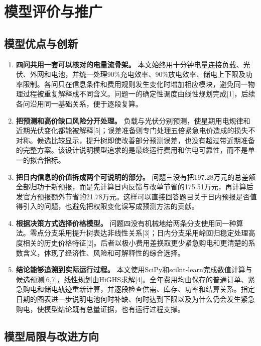 \section{模型评价与推广}

\subsection{模型优点与创新}

\begin{enumerate}
    \item \textbf{四问共用一套可以核对的电量流骨架。}
    本文始终用十分钟电量连接负载、光伏、外网和电池，并统一处理90\%充电效率、90\%放电效率、储电上下限及功率限制。各问只在信息条件和费用规则发生变化时增加相应模块，避免同一物理过程被重复解释成不同含义。问题一的确定性调度由线性规划完成[1]，后续各问沿用同一基础关系，便于逐段复算。

    \item \textbf{把预测和高价缺口风险分开处理。}
    负载与光伏分别预测，使星期用电规律和近期光伏变化都能被解释[5]；误差准备则专门处理五倍紧急电价造成的损失不对称。候选比较显示，提升树即使改善部分预测误差，也没有超过带近期准备的完整方案。该设计说明模型追求的是最终运行费用和供电可靠性，而不是单一的拟合指标。

    \item \textbf{把日内信息的价值拆成两个可说明的部分。}
    问题三没有把197.28万元的总差额全部归功于新预报，而是先计算日内反馈与改单节省的175.51万元，再计算后发官方预报额外节省的21.78万元。这样可以直接回答题目关于日内预报是否值得引入的问题，也避免把权限变化误写成预测方法的贡献。

    \item \textbf{根据决策方式选择价格模型。}
    问题四没有机械地给两条分支使用同一种算法。零点分支采用提升树表达非线性关系[3]；日内分支采用岭回归稳定处理高度相关的历史价格特征[2]。后者以极小费用差换取更少紧急购电和更清楚的系数含义，体现了经济性、风险和可解释性的综合选择。

    \item \textbf{结论能够追溯到实际运行过程。}
    本文使用SciPy和scikit-learn完成数值计算与候选预测[6,7]，线性规划由HiGHS求解[4]。全年费用均由保存的普通订单、紧急购电和储电轨迹重新计算，并逐段检查供需、库存、功率和结算关系。指定日期的图表进一步说明电池何时补缺、何时达到下限以及为什么仍会发生紧急购电，使模型结论既有总量证据，也有运行过程支撑。
\end{enumerate}


\subsection{模型局限与改进方向}

